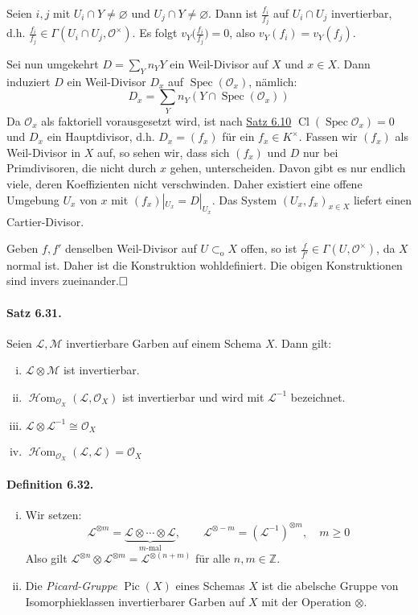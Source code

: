 \documentclass[11pt,b5paper,openany]{memoir}
\def \qed {$\hfill\square$}
\begin{document}
Seien $i,j$ mit $U_i\cap Y\neq\varnothing$ und $U_j\cap Y\neq\varnothing$. Dann ist $\frac{f_i}{f_j}$ auf $U_i\cap U_j$ invertierbar, d.h. $\frac{f_i}{f_j}\in\Gamma(U_i\cap U_j,\mathcal{O}^\times)$. Es folgt $v_Y\big(\frac{f_i}{f_j}\big)=0$, also $v_Y(f_i)=v_Y(f_j)$.

Sei nun umgekehrt $D=\sum_Yn_YY$ ein Weil-Divisor auf $X$ und $x\in X$. Dann induziert $D$ ein Weil-Divisor $D_x$ auf $\operatorname{Spec}(\mathcal{O}_x)$, nämlich:
\[D_x=\sum_Y n_Y(Y\cap\operatorname{Spec}(\mathcal{O}_x)) \]
Da $\mathcal{O}_x$ als faktoriell vorausgesetzt wird, ist nach \hyperref[6.10]{Satz 6.10} $\operatorname{Cl}(\operatorname{Spec}\mathcal{O}_x)=0$ und $D_x$ ein Hauptdivisor, d.h. $D_x=(f_x)$ für ein $f_x\in K^\times$. Fassen wir $(f_x)$ als Weil-Divisor in $X$ auf, so sehen wir, dass sich $(f_x)$ und $D$ nur bei Primdivisoren, die nicht durch $x$ gehen, unterscheiden. Davon gibt es nur endlich viele, deren Koeffizienten nicht verschwinden. Daher existiert eine offene Umgebung $U_x$ von $x$ mit $(f_x)|_{U_x}=D|_{U_x}$. Das System $(U_x,f_x)_{x\in X}$ liefert einen Cartier-Divisor.

Geben $f,f'$ denselben Weil-Divisor auf $U\subset_\text{o}X$ offen, so ist $\frac{f}{f'}\in\Gamma(U,\mathcal{O}^\times)$, da $X$ normal ist. Daher ist die Konstruktion wohldefiniert. Die obigen Konstruktionen sind invers zueinander.\qed

\paragraph{Satz 6.31.}\label{6.31} Seien $\mathcal{L},\mathcal{M}$ invertierbare Garben auf einem Schema $X$. Dann gilt:
\begin{enumerate}[(i)]
\item $\mathcal{L}\otimes \mathcal{M}$ ist invertierbar.
\item $\operatorname{\mathcal{H}om}_{\mathcal{O}_X}(\mathcal{L},\mathcal{O}_X)$ ist invertierbar und wird mit $\mathcal{L}^{-1}$ bezeichnet.
\item $\mathcal{L}\otimes\mathcal{L}^{-1}\cong\mathcal{O}_X$
\item $\operatorname{\mathcal{H}om}_{\mathcal{O}_X}(\mathcal{L},\mathcal{L})=\mathcal{O}_X$
\end{enumerate}

\paragraph{Definition 6.32.}\label{6.32}\begin{enumerate}[(i)]
\item Wir setzen:
\[\mathcal{L}^{\otimes m}=\underbrace{\mathcal{L}\otimes\cdots\otimes\mathcal{L}}_{m\text{-mal}},\quad\quad \mathcal{L}^{\otimes -m}=(\mathcal{L}^{-1})^{\otimes m},\quad m\geq 0 \]
Also gilt $\mathcal{L}^{\otimes n}\otimes\mathcal{L}^{\otimes m}=\mathcal{L}^{\otimes (n+m)}$ für alle $n,m\in\mathbb{Z}$.
\item Die \textit{Picard-Gruppe} $\operatorname{Pic}(X)$ eines Schemas $X$ ist die abelsche Gruppe von Isomorphieklassen invertierbarer Garben auf $X$ mit der Operation $\otimes$.
\end{enumerate}
\end{document}
